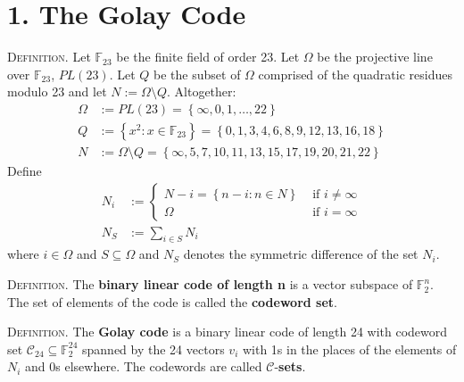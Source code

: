 \documentclass{article}
\renewcommand{\tt}[1]{\text{ #1 }}
\newcommand{\C}{\mathcal{C}}
\newcommand{\F}{\mathbb{F}}
\newcommand{\sse}{\subseteq}
\newcommand{\set}[1]{\left\{ #1 \right\}}
\newcommand{\PL}{\textit{PL}}
\newcommand{\header}[1]{\noindent\textsc{#1.} }
\begin{document}
\section*{1. The Golay Code}

\header{Definition}
Let $\F_{23}$ be the finite field of order 23.
Let $\Omega$ be the projective line over $\F_{23}$, $\PL(23)$.
Let $Q$ be the subset of $\Omega$ comprised of the quadratic residues modulo 23
and let $N := \Omega \setminus Q$.
Altogether:
\begin{align*}
  \Omega &:= \PL(23) = \set{ \infty, 0, 1, \dots, 22 } \\
  Q &:= \set{ x^2 : x \in \F_{23} } = \set{ 0, 1, 3, 4, 6, 8, 9, 12, 13, 16, 18 } \\
  N &:= \Omega \setminus Q = \set{ \infty, 5, 7, 10, 11, 13, 15, 17, 19, 20, 21, 22 }
\end{align*}
Define
\begin{align*}
  N_i &:= \begin{cases}
    N - i = \set{ n - i : n \in N } &\tt{if} i \neq \infty \\
    \Omega &\tt{if} i = \infty
  \end{cases}
  \\
  N_S &:= \sum_{i \in S} N_i
\end{align*}
where $i \in \Omega$ and $S \sse \Omega$ and
$N_S$ denotes the symmetric difference of the set $N_i$.

\header{Definition}
The \textbf{binary linear code of length n} is a vector subspace of $\F_2^n$.
The set of elements of the code is called the \textbf{codeword set}.

\header{Definition}
The \textbf{Golay code} is a binary linear code of length 24 with codeword set $\C_{24} \sse \F_2^{24}$ spanned by the 24 vectors $v_i$ with 1s in the places of the elements of $N_i$ and 0s elsewhere.
The codewords are called $\C$-\textbf{sets}.
\end{document}
